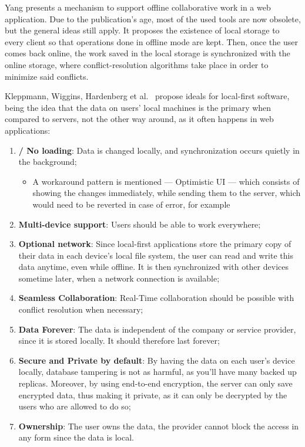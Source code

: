 Yang \cite{Yang2000} presents a mechanism to support offline collaborative work in a web application. Due to the publication's age, most of the used tools are now obsolete, but the general ideas still apply. It proposes the existence of local storage to every client so that operations done in offline mode are kept. Then, once the user comes back online, the work saved in the local storage is synchronized with the online storage, where conflict-resolution algorithms take place in order to minimize said conflicts.

Kleppmann, Wiggins, Hardenberg et al.\ \cite{Kleppmann2019} propose ideals for local-first software, being the idea that the data on users' local machines is the primary when compared to servers, not the other way around, as it often happens in web applications:

\begin{enumerate}
    \item \textbf{ / No loading}: Data is changed locally, and synchronization occurs quietly in the background;
    \begin{itemize}
        \item A workaround pattern is mentioned --- Optimistic UI --- which consists of showing the changes immediately, while sending them to the server, which would need to be reverted in case of error, for example
    \end{itemize}
    \item \textbf{Multi-device support}: Users should be able to work everywhere;
    \item \textbf{Optional network}: Since local-first applications store the primary copy of their data in each device’s local file system, the user can read and write this data anytime, even while offline. It is then synchronized with other devices sometime later, when a network connection is available;
    \item \textbf{Seamless Collaboration}: Real-Time collaboration should be possible with conflict resolution when necessary;
    \item \textbf{Data Forever}: The data is independent of the company or service provider, since it is stored locally. It should therefore last forever;
    \item \textbf{Secure and Private by default}: By having the data on each user's device locally, database tampering is not as harmful, as you'll have many backed up replicas. Moreover, by using end-to-end encryption, the server can only save encrypted data, thus making it private, as it can only be decrypted by the users who are allowed to do so;
    \item \textbf{Ownership}: The user owns the data, the provider cannot block the access in any form since the data is local.
\end{enumerate}

